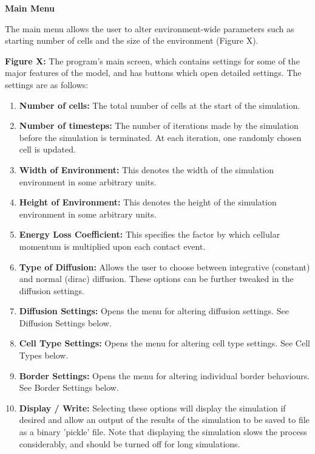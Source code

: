 \documentclass[12pt,a4paper]{report}
\begin{document}
{\bfseries Main Menu}

The main menu allows the user to alter environment-wide parameters such 
as starting number of cells and the size of the environment (Figure X). 



\begin{figure}[H]
\centering
\end{figure}


{\bfseries Figure X: }The program's main screen, which contains settings 
for some of the major features of the model, and has buttons which open 
detailed settings. The settings are as follows:

\begin{enumerate}
\item {\bfseries Number of cells:} The total number of cells at the start 
of the simulation.
\item {\bfseries Number of timesteps:} The number of iterations made by 
the simulation before the simulation is terminated. At each iteration, 
one randomly chosen cell is updated.
\item {\bfseries Width of Environment:} This denotes the width of the 
simulation environment in some arbitrary units.
\item {\bfseries Height of Environment:} This denotes the height of the 
simulation environment in some arbitrary units.
\item {\bfseries Energy Loss Coefficient: }This specifies the factor by 
which cellular momentum is multiplied upon each contact event.
\item {\bfseries Type of Diffusion:} Allows the user to choose between 
integrative (constant) and normal (dirac) diffusion. These options can 
be further tweaked in the diffusion settings.
\item {\bfseries Diffusion Settings:} Opens the menu for altering 
diffusion settings. See Diffusion Settings below.
\item {\bfseries Cell Type Settings: }Opens the menu for altering cell 
type settings. See Cell Types below.
\item {\bfseries Border Settings: }Opens the menu for altering individual 
border behaviours. See Border Settings below.
\item {\bfseries Display / Write:} Selecting these options will display 
the simulation if desired and allow an output of the results of the 
simulation to be saved to file as a binary 'pickle' file. Note that 
displaying the simulation slows the process considerably, and should be 
turned off for long simulations.
\setcounter{numberedCntG}{\theenumi}
\end{enumerate}
\end{document}
